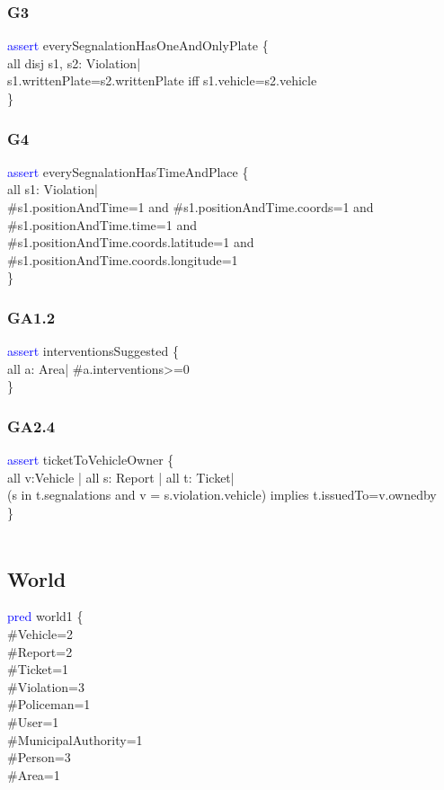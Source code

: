 \subsubsection{G3}
\textcolor{blue}{assert}
\textcolor{mycolor}{everySegnalationHasOneAndOnlyPlate} \{\\
    all disj s1, s2: Violation|\\
s1.writtenPlate=s2.writtenPlate iff s1.vehicle=s2.vehicle\\
\}\\
\subsubsection{G4}
\textcolor{blue}{assert}
\textcolor{mycolor}{everySegnalationHasTimeAndPlace} \{\\
all s1: Violation|\\
\#s1.positionAndTime=1 and \#s1.positionAndTime.coords=1 and \#s1.positionAndTime.time=1 and\\ 
\#s1.positionAndTime.coords.latitude=1 and \#s1.positionAndTime.coords.longitude=1\\
\}\\
\subsubsection{GA1.2}
\textcolor{blue}{assert}
\textcolor{mycolor}{interventionsSuggested} \{\\
all a: Area| \#a.interventions>=0\\
\}\\
\subsubsection{GA2.4}
\textcolor{blue}{assert}
\textcolor{mycolor}{ticketToVehicleOwner} \{\\
all v:Vehicle | all s: Report | all t: Ticket|\\
(s in t.segnalations and v = s.violation.vehicle) implies t.issuedTo=v.ownedby\\
\}\\
\\
\subsection{World}
\textcolor{blue}{pred}
\textcolor{mycolor}{world1} \{\\
\#Vehicle=2\\
\#Report=2\\
\#Ticket=1\\
\#Violation=3\\
\#Policeman=1\\
\#User=1\\
\#MunicipalAuthority=1\\
\#Person=3\\
\#Area=1\\

